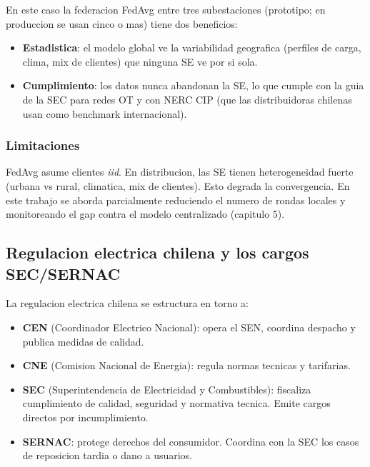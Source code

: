 En este caso la federacion FedAvg entre tres subestaciones (prototipo;
en produccion se usan cinco o mas) tiene dos
beneficios:
\begin{itemize}[leftmargin=*,itemsep=2pt]
  \item \textbf{Estadistica}: el modelo global ve la variabilidad
        geografica (perfiles de carga, clima, mix de clientes) que
        ninguna SE ve por si sola.
  \item \textbf{Cumplimiento}: los datos nunca abandonan la SE, lo
        que cumple con la guia de la SEC para redes OT y con NERC
        CIP (que las distribuidoras chilenas usan como benchmark
        internacional).
\end{itemize}

\subsubsection{Limitaciones}

FedAvg asume clientes \emph{iid}. En distribucion, las SE tienen
heterogeneidad fuerte (urbana vs rural, climatica, mix de clientes).
Esto degrada la convergencia. En este trabajo se aborda parcialmente
reduciendo el numero de rondas locales y monitoreando el gap contra
el modelo centralizado (capitulo 5).

\subsection{Regulacion electrica chilena y los cargos SEC/SERNAC}

La regulacion electrica chilena se estructura en torno a:

\begin{itemize}[leftmargin=*,itemsep=2pt]
  \item \textbf{CEN} (Coordinador Electrico Nacional): opera el SEN,
        coordina despacho y publica medidas de calidad.
  \item \textbf{CNE} (Comision Nacional de Energia): regula normas
        tecnicas y tarifarias.
  \item \textbf{SEC} (Superintendencia de Electricidad y Combustibles):
        fiscaliza cumplimiento de calidad, seguridad y normativa
        tecnica. Emite cargos directos por incumplimiento.
  \item \textbf{SERNAC}: protege derechos del consumidor. Coordina
        con la SEC los casos de reposicion tardia o dano a usuarios.
\end{itemize}

